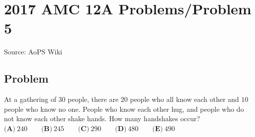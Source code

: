 \documentclass[12pt]{article}
\begin{document}
\section*{{2017 AMC 12A Problems/Problem 5}}
Source: AoPS Wiki

\subsection*{Problem}
At a gathering of $30$ people, there are $20$ people who all know each other and $10$ people who know no one. People who know each other hug, and people who do not know each other shake hands. How many handshakes occur? $\textbf{(A)}\ 240\qquad\textbf{(B)}\ 245\qquad\textbf{(C)}\ 290\qquad\textbf{(D)}\ 480\qquad\textbf{(E)}\ 490$
\end{document}
